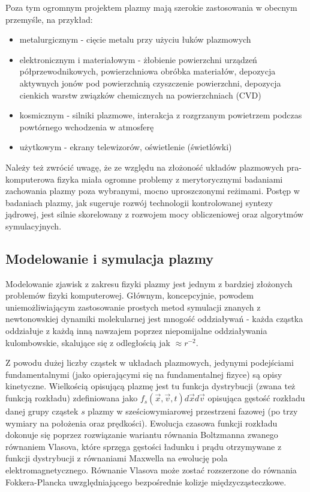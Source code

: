     Poza tym ogromnym projektem plazmy mają szerokie zastosowania w obecnym
    przemyśle, na przykład:
    \begin{itemize}
        \item metalurgicznym - cięcie metalu przy użyciu łuków plazmowych
        \item elektronicznym i materiałowym - żłobienie powierzchni urządzeń
            półprzewodnikowych, powierzchniowa obróbka materiałów, depozycja
            aktywnych jonów pod powierzchnią czyszczenie powierzchni, depozycja
            cienkich warstw związków chemicznych na powierzchniach (CVD)
        \item kosmicznym - silniki plazmowe, interakcja z rozgrzanym powietrzem
            podczas powtórnego wchodzenia w atmosferę
        \item użytkowym - ekrany telewizorów, oświetlenie (świetlówki)
    \end{itemize}

    Należy też zwrócić uwagę, że ze względu na złożoność układów plazmowych
    pra-komputerowa fizyka miała ogromne problemy z merytorycznymi badaniami
    zachowania plazmy poza wybranymi, mocno uproszczonymi reżimami. Postęp w
    badaniach plazmy, jak sugeruje rozwój technologii kontrolowanej syntezy
    jądrowej, jest silnie skorelowany  z
    rozwojem mocy obliczeniowej oraz algorytmów symulacyjnych.

    \subsection{Modelowanie i symulacja plazmy}

    Modelowanie zjawisk z zakresu fizyki plazmy jest jednym z bardziej
    złożonych problemów fizyki komputerowej.  Głównym, koncepcyjnie, powodem
    uniemożliwiającym zastosowanie prostych metod symulacji znanych z
    newtonowskiej dynamiki molekularnej jest mnogość oddziaływań - każda
    cząstka oddziałuje z każdą inną nawzajem poprzez niepomijalne oddziaływania
    kulombowskie, skalujące się z odległością jak
    $\approx r^{-2}$.

    Z powodu dużej liczby cząstek w układach plazmowych, jedynymi podejściami
    fundamentalnymi (jako opierającymi się na fundamentalnej fizyce) są opisy
    kinetyczne. Wielkością opisującą plazmę jest tu funkcja dystrybucji (zwana
    też funkcją rozkładu) zdefiniowana jako $f_s(\vec{x}, \vec{v}, t) d\vec{x}
    d\vec{v}$ opisująca gęstość rozkładu danej grupy cząstek $s$ plazmy w
    sześciowymiarowej przestrzeni fazowej (po trzy wymiary na położenia oraz
    prędkości). Ewolucja czasowa funkcji rozkładu dokonuje się poprzez
    rozwiązanie wariantu równania Boltzmanna zwanego równaniem Vlasova,
    które sprzęga gęstości ładunku i prądu otrzymywane z funkcji dystrybucji
    z równaniami Maxwella na ewolucję pola elektromagnetycznego. Równanie
    Vlasova może zostać rozszerzone do równania Fokkera-Plancka uwzględniającego
    bezpośrednie kolizje międzycząsteczkowe.



